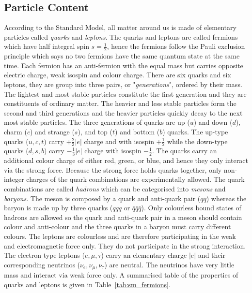 \subsection{Particle Content}
\label{subsec:sm_particle_content}
According to the Standard Model, all matter around us is made of elementary particles called \textit{quarks} and \textit{leptons}.
The quarks and leptons are called fermions which have half integral spin $s=\frac{1}{2}$, hence the fermions follow the Pauli exclusion principle which says no two fermions have the same quantum state at the same time.
Each fermion has an anti-fermion with the equal mass but carries opposite electric charge, weak isospin and colour charge.
There are six quarks and six leptons, they are group into three pairs, or "\textit{generations}", ordered by their mass.
The lightest and most stable particles constitute the first generation and they are constituents of ordinary matter.
The heavier and less stable particles form the second and third generations and the heavier particles quickly decay to the next most stable particles.
The three generations of quarks are up ($u$) and down ($d$), charm ($c$) and strange ($s$), and top ($t$) and bottom ($b$) quarks.
The up-type quarks ($u, c, t$) carry $+\frac{2}{3}|e|$ charge and with isospin $+\frac{1}{2}$ while the down-type quarks ($d, s, b$) carry $-\frac{1}{3}|e|$ charge with isospin $-\frac{1}{2}$.
The quarks carry an additional colour charge of either red, green, or blue, and hence they only interact via the strong force.
Because the strong force holds quarks together, only non-integer charges of the quark combinations are experimentally allowed.
The quark combinations are called \textit{hadrons} which can be categorised into \textit{mesons} and \textit{baryons}.
The meson is composed by a quark and anti-quark pair ($q\bar{q}$) whereas the baryon is made up by three quarks ($qqq$ or $\bar{q}\bar{q}\bar{q}$).
Only colourless bound states of hadrons are allowed so the quark and anti-quark pair in a meson should contain colour and anti-colour and the three quarks in a baryon must carry different colours.
The leptons are colourless and are therefore participating in the weak and electromagnetic force only. 
They do not participate in the strong interaction.
The electron-type leptons ($e, \mu, \tau$) carry an elementary charge $|e|$ and their corresponding neutrinos ($\nu_{e}, \nu_{\mu}, \nu_{\tau}$) are neutral.
The neutrinos have very little mass and interact via weak force only.
A summarised table of the properties of quarks and leptons is given in Table~\ref{tab:sm_fermions}.

